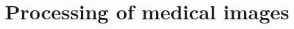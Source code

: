 \documentclass{report}
\begin{document}
\part{Processing of medical images}
%
%
%
%

%

\printglossary[type=\acronymtype]



\end{document}
